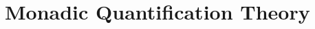 \section{Monadic Quantification Theory}


\newpage


\newpage


\newpage


\newpage


\newpage


\newpage

